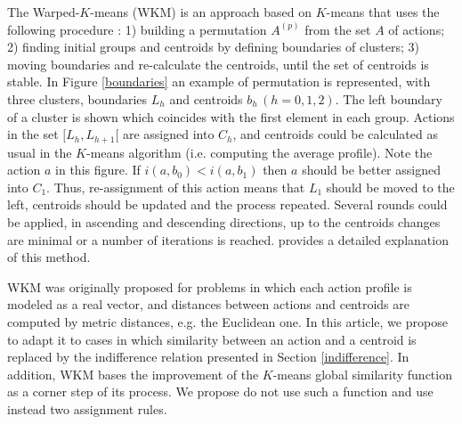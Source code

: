 \documentclass[]{elsarticle}
\theoremstyle{definition}
\begin{document}
The Warped-$K$-means (WKM) is an approach based on $K$-means that uses the following procedure \citep{Leiva2013}: 1) building a permutation $A^{(p)}$ from the set $A$ of actions; 2) finding initial groups and centroids by defining boundaries of clusters; 3) moving boundaries and re-calculate the centroids, until the set of centroids is stable.
 In Figure \ref{boundaries} an example of permutation is represented, with three clusters,  boundaries  $L_h$ and centroids $b_h \, (h=0,1,2)$. The left boundary of a cluster is shown which coincides with the first element in each group. Actions in the set $[L_h, L_{h+1}[$  are assigned into $C_h$, and centroids could be calculated as usual in the $K$-means algorithm (i.e. computing the average profile). Note the  action $a$ in this figure.  If $i(a,b_0) < i(a,b_{1})$ then  $a$ should be better assigned into $C_1$.  Thus, re-assignment of this action means that $L_1$ should be moved to the left,   centroids should be updated and the process repeated. Several rounds could be applied, in ascending and descending directions, up to the centroids changes are minimal or a number of iterations is reached. \cite{Leiva2013} provides a detailed explanation of this method. 
 
 WKM was originally proposed for problems in which each action profile is modeled as a real vector, and distances between actions and centroids are computed by metric distances, e.g. the Euclidean one.  In this article, we propose to adapt it to cases in which similarity between an action and a centroid is replaced by the indifference relation presented in Section \ref{indifference}.  In addition, WKM bases the improvement of the $K$-means global similarity function as a corner step of its process. We propose do not use such a function and use instead two assignment rules.
  
\end{document}
